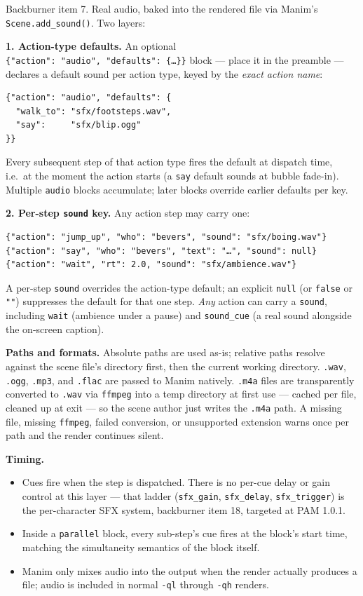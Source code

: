 \documentclass[
  11pt,
]{book}
\begin{document}
Backburner item 7. Real audio, baked into the rendered file via
Manim's \texttt{Scene.add\_sound()}. Two layers:

\textbf{1. Action-type defaults.} An optional
\texttt{\{"action":\ "audio",\ "defaults":\ \{…\}\}} block --- place
it in the preamble --- declares a default sound per action type,
keyed by the \emph{exact action name}:

\begin{verbatim}
{"action": "audio", "defaults": {
  "walk_to": "sfx/footsteps.wav",
  "say":     "sfx/blip.ogg"
}}
\end{verbatim}

Every subsequent step of that action type fires the default at
dispatch time, i.e.\ at the moment the action starts (a \texttt{say}
default sounds at bubble fade-in). Multiple \texttt{audio} blocks
accumulate; later blocks override earlier defaults per key.

\textbf{2. Per-step \texttt{sound} key.} Any action step may carry
one:

\begin{verbatim}
{"action": "jump_up", "who": "bevers", "sound": "sfx/boing.wav"}
{"action": "say", "who": "bevers", "text": "…", "sound": null}
{"action": "wait", "rt": 2.0, "sound": "sfx/ambience.wav"}
\end{verbatim}

A per-step \texttt{sound} overrides the action-type default; an
explicit \texttt{null} (or \texttt{false} or \texttt{""}) suppresses
the default for that one step. \emph{Any} action can carry a
\texttt{sound}, including \texttt{wait} (ambience under a pause) and
\texttt{sound\_cue} (a real sound alongside the on-screen caption).

\textbf{Paths and formats.} Absolute paths are used as-is; relative
paths resolve against the scene file's directory first, then the
current working directory. \texttt{.wav}, \texttt{.ogg},
\texttt{.mp3}, and \texttt{.flac} are passed to Manim natively.
\texttt{.m4a} files are transparently converted to \texttt{.wav} via
\texttt{ffmpeg} into a temp directory at first use --- cached per
file, cleaned up at exit --- so the scene author just writes the
\texttt{.m4a} path. A missing file, missing \texttt{ffmpeg}, failed
conversion, or unsupported extension warns once per path and the
render continues silent.

\textbf{Timing.}

\begin{itemize}
\item
  Cues fire when the step is dispatched. There is no per-cue delay or
  gain control at this layer --- that ladder
  (\texttt{sfx\_gain}, \texttt{sfx\_delay}, \texttt{sfx\_trigger}) is
  the per-character SFX system, backburner item 18, targeted at
  PAM 1.0.1.
\item
  Inside a \texttt{parallel} block, every sub-step's cue fires at the
  block's start time, matching the simultaneity semantics of the
  block itself.
\item
  Manim only mixes audio into the output when the render actually
  produces a file; audio is included in normal \texttt{-ql} through
  \texttt{-qh} renders.
\end{itemize}
\end{document}
